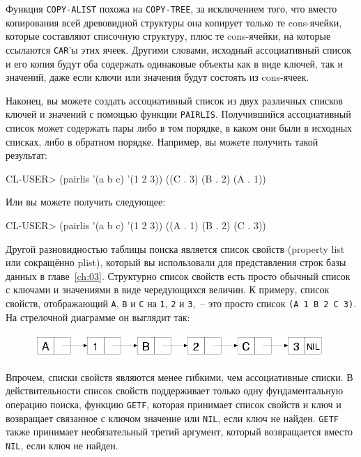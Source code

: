 Функция \lstinline{COPY-ALIST} похожа на \lstinline{COPY-TREE}, за исключением того, что вместо
копирования всей древовидной структуры она копирует только те cons-ячейки, которые
составляют списочную структуру, плюс те cons-ячейки, на которые ссылаются \lstinline{CAR}'ы
этих ячеек. Другими словами, исходный ассоциативный список и его копия будут оба содержать
одинаковые объекты как в виде ключей, так и значений, даже если ключи или значения будут
состоять из cons-ячеек.

Наконец, вы можете создать ассоциативный список из двух различных списков ключей и значений
с помощью функции \lstinline{PAIRLIS}. Получившийся ассоциативный список может содержать пары
либо в том порядке, в каком они были в исходных списках, либо в обратном
порядке. Например, вы можете получить такой результат:

\begin{myverb}
CL-USER> (pairlis '(a b c) '(1 2 3))
((C . 3) (B . 2) (A . 1))
\end{myverb}

Или вы можете получить следующее:

\begin{myverb}
CL-USER> (pairlis '(a b c) '(1 2 3))
((A . 1) (B . 2) (C . 3))
\end{myverb}

Другой разновидностью таблицы поиска является список свойств (property list или сокращённо
plist), который вы использовали для представления строк базы данных в главе~\ref{ch:03}.
Структурно список свойств есть просто обычный список с ключами и значениями в виде
чередующихся величин. К примеру, список свойств, отображающий \lstinline{A}, \lstinline{B} и
\lstinline{C} на \lstinline{1}, \lstinline{2} и \lstinline{3},~-- это просто список \lstinline{(A 1 B 2 C 3)}. На
стрелочной диаграмме он выглядит так:

\begin{figure}[h]
  \centering
  \includegraphics[scale=0.6]{images/plist-abc-123.png}
\end{figure}

Впрочем, списки свойств являются менее гибкими, чем ассоциативные списки. В
действительности список свойств поддерживает только одну фундаментальную операцию поиска,
функцию \lstinline{GETF}, которая принимает список свойств и ключ и возвращает связанное с
ключом значение или \lstinline{NIL}, если ключ не найден. \lstinline{GETF} также принимает
необязательный третий аргумент, который возвращается вместо \lstinline{NIL}, если ключ не
найден.

